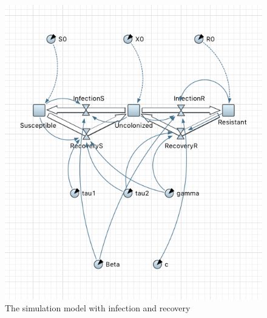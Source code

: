 \begin{figure}[H]
  \centering
  \includegraphics[height=0.6\textwidth]{img/screens/recovery/recovery11}
  \caption{The simulation model with infection and recovery}
\end{figure}